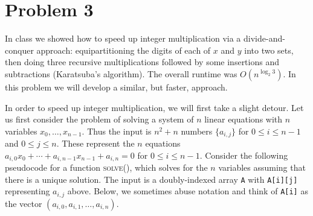 \documentclass[12pt]{article}
\begin{document}
\section*{Problem 3}
In class we showed how to speed up integer multiplication via a divide-and-conquer approach: equipartitioning the digits of each of $x$ and $y$ into two sets, then doing three recursive multiplications followed by some insertions and subtractions (Karatsuba's algorithm). The overall runtime was $O(n^{\log_2 3})$. In this problem we will develop a similar, but faster, approach.

In order to speed up integer multiplication, we will first take a slight detour. Let us first consider the problem of solving a system of $n$ linear equations with $n$ variables $x_0,\ldots,x_{n-1}$. Thus the input is $n^2+n$ numbers $\{a_{i,j}\}$ for $0\le i\le n-1$ and $0\le j\le n$. These represent the $n$ equations $a_{i,0}x_0 + \cdots + a_{i,n-1}x_{n-1} + a_{i,n} = 0$ for $0\le i\le n-1$. Consider the following pseudocode for a function \textsc{solve()}, which solves for the $n$ variables assuming that there is a unique solution. The input is a doubly-indexed array \texttt{A} with \texttt{A[i][j]} representing $a_{i,j}$ above. Below, we sometimes abuse notation and think of \texttt{A[i]} as the vector $(a_{i,0}, a_{i,1}, \ldots, a_{i,n})$.
\end{document}
